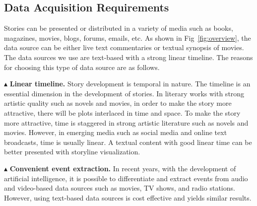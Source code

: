\documentclass[review,journal]{vgtc}         %
\begin{document}
\subsection{Data Acquisition Requirements}
\noindent Stories can be presented or distributed in a variety of media such as books, magazines, movies, blogs, forums, emails, etc. As shown in Fig~\ref{fig:overview}, the data source can be either live text commentaries or textual synopsis of movies. The data sources we use are text-based with a strong linear timeline. The reasons for choosing this type of data source are as follows.

$\blacktriangle$ \textbf{Linear timeline.} Story development is temporal in nature. The timeline is an essential dimension in the development of stories. In literary works with strong artistic quality such as novels and movies, in order to make the story more attractive, there will be plots interlaced in time and space. To make the story more attractive, time is staggered in strong artistic literature such as novels and movies. However, in emerging media such as social media and online text broadcasts, time is usually linear. A textual content with good linear time can be better presented with storyline visualization.  

$\blacktriangle$ \textbf{Convenient event extraction.} In recent years, with the development of artificial intelligence, it is possible to differentiate and extract events from audio and video-based data sources such as movies, TV shows, and radio stations. However, using text-based data sources is cost effective and yields similar results.
\end{document}
